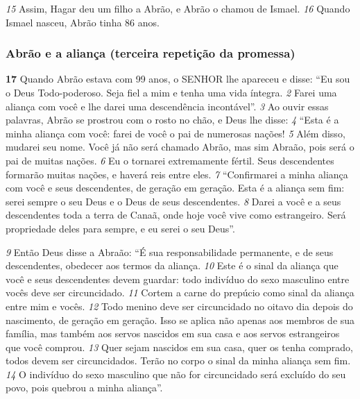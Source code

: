 \bigskip
\textit{\tiny 15}
Assim, Hagar deu um filho a Abrão, e Abrão o chamou de Ismael. 
\textit{\tiny 16}
Quando
Ismael nasceu, Abrão tinha 86 anos.

\bigskip
\subsubsection*{Abrão e a aliança (terceira repetição da promessa)}
\textbf{\large 17}
 Quando Abrão estava com 99 anos, o SENHOR lhe apareceu e disse: “Eu sou
o Deus Todo-poderoso. Seja fiel a mim e tenha uma vida íntegra. 
\textit{\tiny 2}
Farei uma
aliança com você e lhe darei uma descendência incontável”.
\textit{\tiny 3}
Ao ouvir essas palavras, Abrão se prostrou com o rosto no chão, e Deus lhe
disse: 
\textit{\tiny 4}
“Esta é a minha aliança com você: farei de você o pai de numerosas nações!
\textit{\tiny 5}
Além disso, mudarei seu nome. Você já não será chamado Abrão, mas sim
Abraão, pois será o pai de muitas nações. 
\textit{\tiny 6}
Eu o tornarei extremamente fértil.
Seus descendentes formarão muitas nações, e haverá reis entre eles.
\textit{\tiny 7}
“Confirmarei a minha aliança com você e seus descendentes, de geração em
geração. Esta é a aliança sem fim: serei sempre o seu Deus e o Deus de seus
descendentes. 
\textit{\tiny 8}
Darei a você e a seus descendentes toda a terra de Canaã, onde
hoje você vive como estrangeiro. Será propriedade deles para sempre, e eu serei o
seu Deus”.

\bigskip
\textit{\tiny 9}
Então Deus disse a Abraão: “É sua responsabilidade permanente, e de seus
descendentes, obedecer aos termos da aliança. 
\textit{\tiny 10}
Este é o sinal da aliança que você
e seus descendentes devem guardar: todo indivíduo do sexo masculino entre
vocês deve ser circuncidado. 
\textit{\tiny 11}
Cortem a carne do prepúcio como sinal da aliança
entre mim e vocês. 
\textit{\tiny 12}
Todo menino deve ser circuncidado no oitavo dia depois do
nascimento, de geração em geração. Isso se aplica não apenas aos membros de sua família, mas também aos servos nascidos em sua casa e aos servos
estrangeiros que você comprou. 
\textit{\tiny 13}
Quer sejam nascidos em sua casa, quer os
tenha comprado, todos devem ser circuncidados. Terão no corpo o sinal da minha
aliança sem fim. 
\textit{\tiny 14}
O indivíduo do sexo masculino que não for circuncidado será
excluído do seu povo, pois quebrou a minha aliança”.

